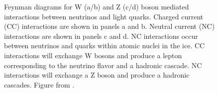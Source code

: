 \begin{figure}
    \caption{Feynman diagrams for W (a/b) and Z (c/d) boson mediated interactions between neutrinos and light quarks. Charged current (CC) interactions are shown in panels a and b. Neutral current (NC) interactions are shown in panels c and d. NC interactions occur between neutrinos and quarks within atomic nuclei in the ice. CC interactions will exchange W bosons and produce a lepton corresponding to the neutrino flavor and a hadronic cascade. NC interactions will exchange a Z boson and produce a hadronic cascades. Figure from \cite{physics_withIC3}.}
    \label{fig:ic2_ccORnc}
\end{figure}

